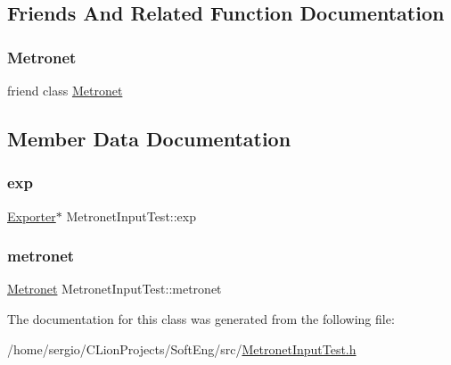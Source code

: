 \subsection{Friends And Related Function Documentation}
\mbox{\label{class_metronet_input_test_a07c94fb69880743e62f64a941fc2d4ab}} 
\subsubsection{\texorpdfstring{Metronet}{Metronet}}
{\footnotesize\ttfamily friend class \hyperlink{class_metronet}{Metronet}\hspace{0.3cm}{\ttfamily [friend]}}



\subsection{Member Data Documentation}
\mbox{\label{class_metronet_input_test_ae16b3047e5801a34ef23dd9314e44770}} 
\subsubsection{\texorpdfstring{exp}{exp}}
{\footnotesize\ttfamily \hyperlink{class_exporter}{Exporter}$\ast$ Metronet\+Input\+Test\+::exp\hspace{0.3cm}{\ttfamily [protected]}}

\mbox{\label{class_metronet_input_test_ab922ed7c2e4f1dfee1ed7df1eb3a13b4}} 
\subsubsection{\texorpdfstring{metronet}{metronet}}
{\footnotesize\ttfamily \hyperlink{class_metronet}{Metronet} Metronet\+Input\+Test\+::metronet\hspace{0.3cm}{\ttfamily [protected]}}



The documentation for this class was generated from the following file\+:\begin{DoxyCompactItemize}
\item 
/home/sergio/\+C\+Lion\+Projects/\+Soft\+Eng/src/\hyperlink{_metronet_input_test_8h}{Metronet\+Input\+Test.\+h}\end{DoxyCompactItemize}
